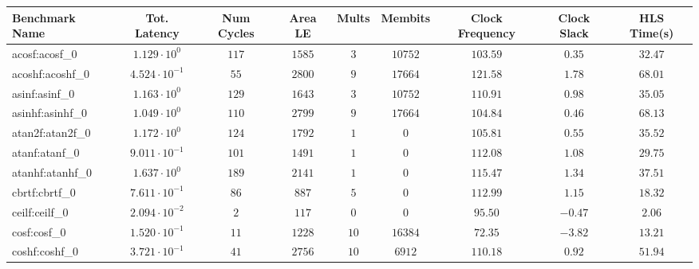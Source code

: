 \begin{tabular}{|l|c|c|c|c|c|c|c|c|}
\hline
Benchmark Name               & Tot. Latency            & Num Cycles & Area LE   & Mults   & Membits    & Clock Frequency & Clock Slack & HLS Time(s) \\
\hline
acosf:acosf\_0               & $ 1.129 \cdot 10^{0}  $ & $ 117    $ & $ 1585  $ & $ 3   $ & $ 10752  $ & $ 103.59      $ & $ 0.35    $ & $ 32.47   $ \\
acoshf:acoshf\_0             & $ 4.524 \cdot 10^{-1} $ & $ 55     $ & $ 2800  $ & $ 9   $ & $ 17664  $ & $ 121.58      $ & $ 1.78    $ & $ 68.01   $ \\
asinf:asinf\_0               & $ 1.163 \cdot 10^{0}  $ & $ 129    $ & $ 1643  $ & $ 3   $ & $ 10752  $ & $ 110.91      $ & $ 0.98    $ & $ 35.05   $ \\
asinhf:asinhf\_0             & $ 1.049 \cdot 10^{0}  $ & $ 110    $ & $ 2799  $ & $ 9   $ & $ 17664  $ & $ 104.84      $ & $ 0.46    $ & $ 68.13   $ \\
atan2f:atan2f\_0             & $ 1.172 \cdot 10^{0}  $ & $ 124    $ & $ 1792  $ & $ 1   $ & $ 0      $ & $ 105.81      $ & $ 0.55    $ & $ 35.52   $ \\
atanf:atanf\_0               & $ 9.011 \cdot 10^{-1} $ & $ 101    $ & $ 1491  $ & $ 1   $ & $ 0      $ & $ 112.08      $ & $ 1.08    $ & $ 29.75   $ \\
atanhf:atanhf\_0             & $ 1.637 \cdot 10^{0}  $ & $ 189    $ & $ 2141  $ & $ 1   $ & $ 0      $ & $ 115.47      $ & $ 1.34    $ & $ 37.51   $ \\
cbrtf:cbrtf\_0               & $ 7.611 \cdot 10^{-1} $ & $ 86     $ & $ 887   $ & $ 5   $ & $ 0      $ & $ 112.99      $ & $ 1.15    $ & $ 18.32   $ \\
ceilf:ceilf\_0               & $ 2.094 \cdot 10^{-2} $ & $ 2      $ & $ 117   $ & $ 0   $ & $ 0      $ & $ 95.50       $ & $ -0.47   $ & $ 2.06    $ \\
cosf:cosf\_0                 & $ 1.520 \cdot 10^{-1} $ & $ 11     $ & $ 1228  $ & $ 10  $ & $ 16384  $ & $ 72.35       $ & $ -3.82   $ & $ 13.21   $ \\
coshf:coshf\_0               & $ 3.721 \cdot 10^{-1} $ & $ 41     $ & $ 2756  $ & $ 10  $ & $ 6912   $ & $ 110.18      $ & $ 0.92    $ & $ 51.94   $ \\

\end{tabular}
